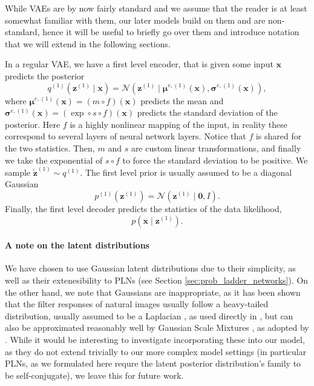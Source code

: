 \documentclass{article}
\renewcommand{\vec}[1]{\mathbf{#1}}
\newcommand{\Norm}[1]{\mathcal{N}\left( #1 \right)}
\newcommand{\MU}{\boldsymbol\mu}
\newcommand{\SIGMA}{\boldsymbol\sigma}
\begin{document}
\par While VAEs are by now fairly standard and we assume that the reader is at
least somewhat familiar with them, our later models build on them and are
non-standard, hence it will be useful to briefly go over them and introduce
notation that we will extend in the following sections.


In a regular VAE, we have a first level encoder, that is given some input
$\vec{x}$ predicts the posterior
\[
  q^{(1)}(\vec{z}^{(1)} \mid \vec{x}) = \Norm{\vec{z}^{(1)} \mid
  \MU^{e, (1)}(\vec{x}), \SIGMA^{e, (1)}(\vec{x})},
\]
where $\MU^{e, (1)}(\vec{x}) = (m \circ f)(\vec{x})$ predicts the mean and
$\SIGMA^{e, (1)}(\vec{x}) = (\exp \circ s \circ f)(\vec{x})$ predicts the
standard deviation of the posterior. Here $f$ is a highly nonlinear mapping of
the input, in reality these correspond to several layers of neural network
layers. Notice that $f$ is shared for the two statistics. Then, $m$ and $s$ are
custom linear transformations, and finally we take the exponential of $s \circ f
$ to force the standard deviation to be positive. We sample $\vec{\tilde{z}}^{(1)}
\sim q^{(1)}$.
The first level prior is usually assumed to be a diagonal Gaussian
\[
  p^{(1)}(\vec{z}^{(1)})  = \Norm{\vec{z}^{(1)} \mid \vec{0}, I}.
\]
Finally, the first level decoder predicts the statistics of the data likelihood,
\[
  p(\vec{x} \mid \vec{z}^{(1)}).
\]

\paragraph{A note on the latent distributions} We have chosen to use Gaussian
latent distributions due to their simplicity, as well as their extenesibility to
PLNs (see Section \ref{sec:prob_ladder_networks}). On the other hand, we note
that Gaussians are inappropriate, as it has been shown that the filter responses
of natural images usually follow a heavy-tailed distribution, usually assumed to
be a Laplacian \cite{jain1989fundamentals}, as used directly in
\cite{clic2018winner}, but can also be approximated reasonably well by Gaussian
Scale Mixtures \cite{portilla2003image}, as adopted by \cite{theis2017lossy}.
While it would be interesting to investigate incorporating these into our
model, as they do not extend trivially to our more complex model settings (in
particular PLNs, as we formulated here requre the latent posterior
distribution's family to be self-conjugate), we leave this for future work.
\end{document}
